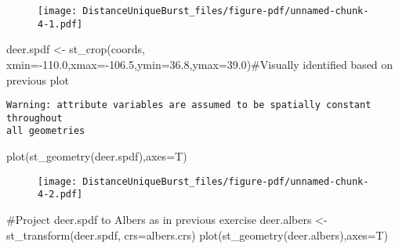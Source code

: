 \documentclass[
  letterpaper,
]{book}
\newenvironment{Shaded}{\begin{snugshade}}{\end{snugshade}}
\newcommand{\AttributeTok}[1]{\textcolor[rgb]{0.40,0.45,0.13}{#1}}
\newcommand{\CommentTok}[1]{\textcolor[rgb]{0.37,0.37,0.37}{#1}}
\newcommand{\FloatTok}[1]{\textcolor[rgb]{0.68,0.00,0.00}{#1}}
\newcommand{\FunctionTok}[1]{\textcolor[rgb]{0.28,0.35,0.67}{#1}}
\newcommand{\NormalTok}[1]{\textcolor[rgb]{0.00,0.23,0.31}{#1}}
\newcommand{\OtherTok}[1]{\textcolor[rgb]{0.00,0.23,0.31}{#1}}
\newcommand{\SpecialCharTok}[1]{\textcolor[rgb]{0.37,0.37,0.37}{#1}}
\begin{document}
\begin{figure}[H]

{\centering \texttt{[image: DistanceUniqueBurst\_files/figure-pdf/unnamed-chunk-4-1.pdf]}

}

\end{figure}

\begin{Shaded}
\begin{Highlighting}[]
\NormalTok{deer.spdf }\OtherTok{\textless{}{-}} \FunctionTok{st\_crop}\NormalTok{(coords, }\AttributeTok{xmin=}\SpecialCharTok{{-}}\FloatTok{110.0}\NormalTok{,}\AttributeTok{xmax=}\SpecialCharTok{{-}}\FloatTok{106.5}\NormalTok{,}\AttributeTok{ymin=}\FloatTok{36.8}\NormalTok{,}\AttributeTok{ymax=}\FloatTok{39.0}\NormalTok{)}\CommentTok{\#Visually identified based on previous plot}
\end{Highlighting}
\end{Shaded}

\begin{verbatim}
Warning: attribute variables are assumed to be spatially constant throughout
all geometries
\end{verbatim}

\begin{Shaded}
\begin{Highlighting}[]
\FunctionTok{plot}\NormalTok{(}\FunctionTok{st\_geometry}\NormalTok{(deer.spdf),}\AttributeTok{axes=}\NormalTok{T)}
\end{Highlighting}
\end{Shaded}

\begin{figure}[H]

{\centering \texttt{[image: DistanceUniqueBurst\_files/figure-pdf/unnamed-chunk-4-2.pdf]}

}

\end{figure}

\begin{Shaded}
\begin{Highlighting}[]
\CommentTok{\#Project deer.spdf to Albers as in previous exercise}
\NormalTok{deer.albers }\OtherTok{\textless{}{-}}\FunctionTok{st\_transform}\NormalTok{(deer.spdf, }\AttributeTok{crs=}\NormalTok{albers.crs)}
\FunctionTok{plot}\NormalTok{(}\FunctionTok{st\_geometry}\NormalTok{(deer.albers),}\AttributeTok{axes=}\NormalTok{T)}
\end{Highlighting}
\end{Shaded}
\end{document}
